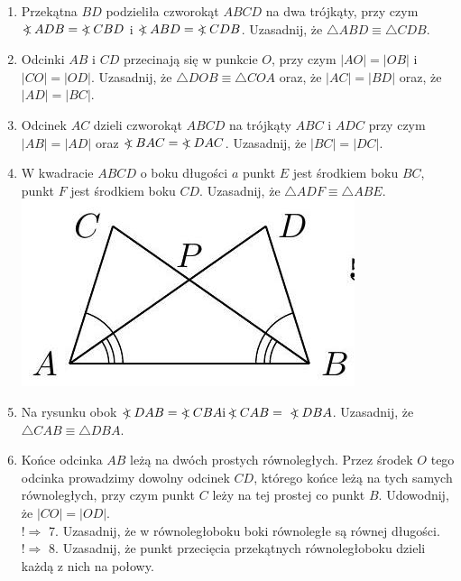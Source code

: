 \documentclass[10pt]{article}
\newcommand\Varangle{\mathop{{<\!\!\!\!\!\text{\small)}}\:}\nolimits}
\begin{document}
\begin{enumerate}
  \item Przekątna \(B D\) podzieliła czworokąt \(A B C D\) na dwa trójkąty, przy czym \(\Varangle A D B=\Varangle C B D\) i \(\Varangle A B D=\Varangle C D B\). Uzasadnij, że \(\triangle A B D \equiv \triangle C D B\).
  \item Odcinki \(A B\) i \(C D\) przecinają się w punkcie \(O\), przy czym \(|A O|=|O B|\) i \(|C O|=|O D|\). Uzasadnij, że \(\triangle D O B \equiv \triangle C O A\) oraz, że \(|A C|=|B D|\) oraz, że \(|A D|=|B C|\).
  \item Odcinek \(A C\) dzieli czworokąt \(A B C D\) na trójkąty \(A B C\) i \(A D C\) przy czym \(|A B|=|A D|\) oraz \(\Varangle B A C=\Varangle D A C\). Uzasadnij, że \(|B C|=|D C|\).
  \item W kwadracie \(A B C D\) o boku długości \(a\) punkt \(E\) jest środkiem boku \(B C\), punkt \(F\) jest środkiem boku \(C D\). Uzasadnij, że \(\triangle A D F \equiv \triangle A B E\).\\
\includegraphics[max width=\textwidth, center]{2024_11_21_71f62bd117d375398909g-048}
  \item Na rysunku obok \(\Varangle D A B=\Varangle C B A \mathrm{i} \Varangle C A B=\) \(\Varangle D B A\). Uzasadnij, że \(\triangle C A B \equiv \triangle D B A\).
  \item Końce odcinka \(A B\) leżą na dwóch prostych równoległych. Przez środek \(O\) tego odcinka prowadzimy dowolny odcinek \(C D\), którego końce leżą na tych samych równoległych, przy czym punkt \(C\) leży na tej prostej co punkt \(B\). Udowodnij, że \(|C O|=|O D|\).\\
\(!\Rightarrow\) 7. Uzasadnij, że w równoległoboku boki równoległe są równej długości.\\
\(!\Rightarrow\) 8. Uzasadnij, że punkt przecięcia przekątnych równoległoboku dzieli każdą z nich na połowy.
\end{enumerate}
\end{document}
